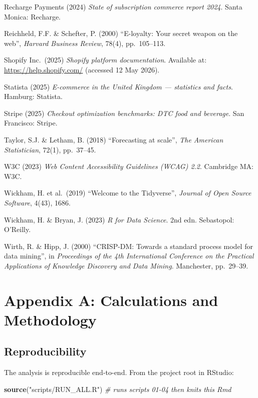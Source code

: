 \documentclass[
  11pt,
]{article}
\newenvironment{Shaded}{\begin{snugshade}}{\end{snugshade}}
\newcommand{\CommentTok}[1]{\textcolor[rgb]{0.56,0.35,0.01}{\textit{#1}}}
\newcommand{\FunctionTok}[1]{\textcolor[rgb]{0.13,0.29,0.53}{\textbf{#1}}}
\newcommand{\NormalTok}[1]{#1}
\newcommand{\StringTok}[1]{\textcolor[rgb]{0.31,0.60,0.02}{#1}}
\begin{document}
Recharge Payments (2024) \emph{State of subscription commerce report
2024}. Santa Monica: Recharge.

Reichheld, F.F. \& Schefter, P. (2000) ``E-loyalty: Your secret weapon
on the web'', \emph{Harvard Business Review}, 78(4), pp.~105--113.

Shopify Inc.~(2025) \emph{Shopify platform documentation}. Available at:
\url{https://help.shopify.com/} (accessed 12 May 2026).

Statista (2025) \emph{E-commerce in the United Kingdom --- statistics
and facts}. Hamburg: Statista.

Stripe (2025) \emph{Checkout optimization benchmarks: DTC food and
beverage}. San Francisco: Stripe.

Taylor, S.J. \& Letham, B. (2018) ``Forecasting at scale'', \emph{The
American Statistician}, 72(1), pp.~37--45.

W3C (2023) \emph{Web Content Accessibility Guidelines (WCAG) 2.2}.
Cambridge MA: W3C.

Wickham, H. et al.~(2019) ``Welcome to the Tidyverse'', \emph{Journal of
Open Source Software}, 4(43), 1686.

Wickham, H. \& Bryan, J. (2023) \emph{R for Data Science}. 2nd edn.
Sebastopol: O'Reilly.

Wirth, R. \& Hipp, J. (2000) ``CRISP-DM: Towards a standard process
model for data mining'', in \emph{Proceedings of the 4th International
Conference on the Practical Applications of Knowledge Discovery and Data
Mining}. Manchester, pp.~29--39.

\newpage

\section{Appendix A: Calculations and
Methodology}\label{appendix-a-calculations-and-methodology}

\subsection{Reproducibility}\label{reproducibility}

The analysis is reproducible end-to-end. From the project root in
RStudio:

\begin{Shaded}
\begin{Highlighting}[]
\FunctionTok{source}\NormalTok{(}\StringTok{"scripts/RUN\_ALL.R"}\NormalTok{)   }\CommentTok{\# runs scripts 01{-}04 then knits this Rmd}
\end{Highlighting}
\end{Shaded}
\end{document}

